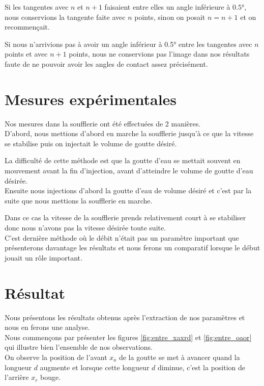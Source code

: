 Si les tangentes avec $n$ et $n+1$ faisaient entre elles un angle inférieure à $\ang{0.5}$, nous conservions la tangente faite avec $n$ points, sinon on posait $n = n+1$ et on recommençait.

Si nous n'arrivions pas à avoir un angle inférieur à \ang{0.5}  entre les tangentes avec $n$ points et avec $n+1$ points, nous ne conservions pas l'image dans nos résultats faute de ne pouvoir avoir les angles de contact assez précisément.

\section{Mesures expérimentales}

Nos mesures dans la soufflerie ont été effectuées de 2 manières.\\

D'abord, nous mettions d'abord en marche la soufflerie jusqu'à ce que la vitesse se stabilise puis on injectait le volume de goutte désiré.

La difficulté de cette méthode est que la goutte d'eau se mettait souvent en mouvement avant la fin d'injection, avant d'atteindre le volume de goutte d'eau désirée.\\

Ensuite nous injections d'abord la goutte d'eau de volume désiré et c'est par la suite que nous mettions la soufflerie en marche.

Dans ce cas la vitesse de la soufflerie prends relativement court à se stabiliser donc nous n'avons pas la vitesse désirée toute suite.\\

C'est dernière méthode où le débit n'était pas un paramètre important que présenterons davantage les résultats et nous ferons un comparatif lorsque le début jouait un rôle important.
\newpage
\section{Résultat}

Nous présentons les résultats obtenus après l'extraction de nos paramètres et nous en ferons une analyse.\\
Nous commençons par présenter les figures \ref{fig:entre_xaxrd} et \ref{fig:entre_oaor} qui illustre bien l'ensemble de nos observations.\\

On observe la position de l'avant $x_{a}$ de la goutte se met à avancer quand la longueur $d$ augmente et lorsque cette longueur $d$ diminue, c'est la position de l'arrière $x_{r}$ bouge.

